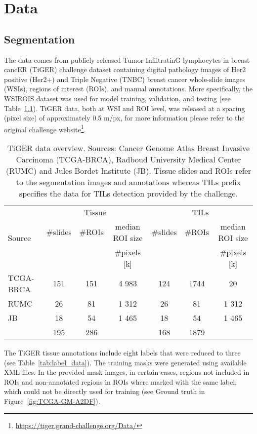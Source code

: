 \chapter{Data}
\section{Segmentation}
The data comes from publicly released Tumor InfiltratinG lymphocytes in
breast cancER (TiGER) challenge dataset containing
digital pathology images of Her2 positive (Her2+) and Triple Negative (TNBC) breast
cancer whole-slide images (WSIs), regions of interest (ROIs), and manual annotations. More specifically, the WSIROIS dataset
was used for model training, validation, and testing (see Table~\ref*{tab:segm_data}).
TiGER data, both at WSI and ROI level, was released at a spacing (pixel size) of approximately 0.5 \textmu m/px,
for more information please refer to the original challenge
website\footnote{\url{https://tiger.grand-challenge.org/Data/}}.
\begin{table}[h!]
\centering
\begin{tabular}{ l c c c c c c } 
\hline
\multirow{3}{*}{Source} &  \multicolumn{3}{c}{Tissue} & \multicolumn{3}{c}{TILs}\\ 
\cline{2-7}
 & \#slides & \#ROIs & median ROI size & \#slides & \#ROIs & median ROI size \\ 
  & & & \#pixels [k] & & & \#pixels [k] \\ 
\hline
TCGA-BRCA & 151 & 151 & 4 983 & 124 & 1744 & 20\\ 
RUMC & 26 & 81 & 1 312 & 26 & 81 & 1 312\\ 
JB & 18 & 54 & 1 465 & 18 & 54 & 1 465\\
\hline
 & 195 & 286 & & 168 & 1879 &\\
\end{tabular}
\caption{\label{tab:segm_data}TiGER data overview. Sources: Cancer Genome Atlas Breast Invasive Carcinoma (TCGA-BRCA),
Radboud University Medical Center (RUMC) and Jules Bordet Institute (JB). Tissue slides and ROIs refer to the segmentation
images and annotations whereas TILs prefix specifies the data for TILs detection provided by the challenge. }
\end{table}
The TiGER tissue annotations include eight
labels that were reduced to three (see Table~\ref*{tab:label_data}).
The training masks were generated using available XML files. In the provided mask
images, in certain cases, regions not included in ROIs and non-annotated regions in ROIs where
marked with the same label, which could not be directly used for training (see Ground truth in Figure~\ref*{fig:TCGA-GM-A2DF}).
